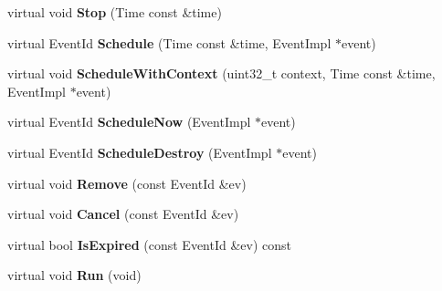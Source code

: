 \begin{DoxyCompactItemize}
\item 
\hypertarget{classns3_1_1PLC__SimulatorImpl_ae8efb0e58dfe1515b884ba9337f45c1c}{virtual void {\bfseries \-Stop} (\-Time const \&time)}\label{classns3_1_1PLC__SimulatorImpl_ae8efb0e58dfe1515b884ba9337f45c1c}

\item 
\hypertarget{classns3_1_1PLC__SimulatorImpl_a183d1d27cf8da25e483319ee66166ed7}{virtual \-Event\-Id {\bfseries \-Schedule} (\-Time const \&time, \-Event\-Impl $\ast$event)}\label{classns3_1_1PLC__SimulatorImpl_a183d1d27cf8da25e483319ee66166ed7}

\item 
\hypertarget{classns3_1_1PLC__SimulatorImpl_a58d308f1869dbaaa3c821eea72b68fa9}{virtual void {\bfseries \-Schedule\-With\-Context} (uint32\-\_\-t context, \-Time const \&time, \-Event\-Impl $\ast$event)}\label{classns3_1_1PLC__SimulatorImpl_a58d308f1869dbaaa3c821eea72b68fa9}

\item 
\hypertarget{classns3_1_1PLC__SimulatorImpl_a6eba0f61169de77d560e120f5e724123}{virtual \-Event\-Id {\bfseries \-Schedule\-Now} (\-Event\-Impl $\ast$event)}\label{classns3_1_1PLC__SimulatorImpl_a6eba0f61169de77d560e120f5e724123}

\item 
\hypertarget{classns3_1_1PLC__SimulatorImpl_a596f39c9b6684a9677f134d0cab2c87d}{virtual \-Event\-Id {\bfseries \-Schedule\-Destroy} (\-Event\-Impl $\ast$event)}\label{classns3_1_1PLC__SimulatorImpl_a596f39c9b6684a9677f134d0cab2c87d}

\item 
\hypertarget{classns3_1_1PLC__SimulatorImpl_aa4a876ce87dae5f2c48456ef31452347}{virtual void {\bfseries \-Remove} (const \-Event\-Id \&ev)}\label{classns3_1_1PLC__SimulatorImpl_aa4a876ce87dae5f2c48456ef31452347}

\item 
\hypertarget{classns3_1_1PLC__SimulatorImpl_aff2afff0c45296f01e4df3680c191938}{virtual void {\bfseries \-Cancel} (const \-Event\-Id \&ev)}\label{classns3_1_1PLC__SimulatorImpl_aff2afff0c45296f01e4df3680c191938}

\item 
\hypertarget{classns3_1_1PLC__SimulatorImpl_a8779ddc4012f9d30c9574f526a13bb66}{virtual bool {\bfseries \-Is\-Expired} (const \-Event\-Id \&ev) const }\label{classns3_1_1PLC__SimulatorImpl_a8779ddc4012f9d30c9574f526a13bb66}

\item 
\hypertarget{classns3_1_1PLC__SimulatorImpl_a15d1389439e30176815f080c5ed06084}{virtual void {\bfseries \-Run} (void)}\label{classns3_1_1PLC__SimulatorImpl_a15d1389439e30176815f080c5ed06084}


\end{DoxyCompactItemize}
